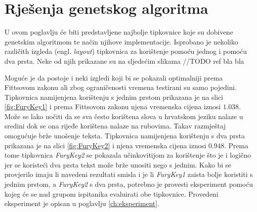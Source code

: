 \documentclass[times, utf8, zavrsni]{fer}
\begin{document}
\clearpage

\section{Rješenja genetskog algoritma}
U ovom poglavlju će biti predstavljene najbolje tipkovnice koje su dobivene genetskim algoritmom te način njihove implementacije. Isprobano je nekoliko različith izgleda (engl. \emph{layout}) tipkovnica za korištenje pomoću jednog i pomoću dva prsta. Neke od njih prikazane su na sljedećim slikama //TODO ref bla bla

Moguće je da postoje i neki izgledi koji bi se pokazali optimalniji prema Fittsovom zakonu ali zbog ograničenosti vremena testirani su samo pojedini. Tipkovnica namijenjena korištenju s jednim prstom prikazana je na slici \ref{fig:FuryKey1} i prema Fittsovom zakonu njena vremenska cijena iznosi $1.038$. Može se lako uočiti da se sva često korištena slova u hrvatskom jeziku nalaze u sredini dok se ona rijeđe korištena nalaze na rubovima. Takav razmještaj omogućuje brže unošenje teksta. Tipkovnica namijenjena korištenju s dva prsta prikazana je na slici \ref{fig:FuryKey2} i njena vremenska cijena iznosi $0.948$. Prema tome tipkovnica \emph{FuryKey2} se pokazala učinkovitijom za korištenje što je i logično jer se koristeći dva prsta tekst može brže unositi nego s jednim. Kako bi se provjerilo imaju li navedeni rezultati smisla i je li \emph{FuryKey1} zaista bolje koristiti s jednim prstom, a \emph{FuryKey2} s dva prsta, potrebno je provesti eksperiment pomoću kojeg će se nad grupom ispitanika evaluirati obe tipkovnice. Provedeni eksperiment je opisan u poglavlju \ref{ch:eksperiment}.
\end{document}
